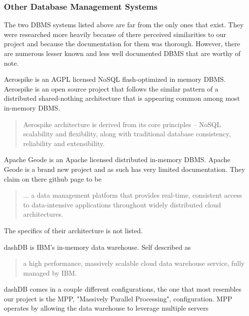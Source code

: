\documentclass[letterpaper]{article}
\begin{document}
	\subsubsection{Other Database Management Systems}
	The two DBMS systems listed above are far from the only ones that exist. They were
	researched more heavily because of there perceived similarities to our project and
	because the documentation for them was thorough. However, there are numerous lesser
	known and less well documented DBMS that are worthy of note.
	\par\vspace{\baselineskip}
	Aerospike is an AGPL licensed NoSQL flash-optimized in memory 
	DBMS. Aerospike is an open source project that follows the similar pattern of 
	a distributed shared-nothing architecture that is appearing common among most
	in-memory DBMS. 
	\begin{quote}
	Aerospike architecture is derived from its core principles – NoSQL scalability and
	flexibility, along with traditional database consistency, reliability and extensibility.
	\cite{aerospike}
	\end{quote}
	\par\vspace{\baselineskip}
	\cite{aerospike}
	\par\vspace{\baselineskip}	
	Apache Geode is an Apache licensed distributed in-memory DBMS. Apache Geode is a brand
	new project and as such has very limited documentation. They claim on there github page
	to be 
	\begin{quote}
	... a data management platform that provides real-time, consistent access to 
	data-intensive applications throughout widely distributed cloud architectures.
	\end{quote}
	The specifics of their architecture is not listed. 
	\par\vspace{\baselineskip}
	dashDB is IBM's in-memory data warehouse. Self described as 
	\begin{quote}
	a high performance, massively scalable cloud data warehouse service, 
	fully managed by IBM. \cite{dashDB}
	\end{quote}
	dashDB comes in a couple different configurations, the one that most resembles 
	our project is the MPP, "Massively Parallel Processing", configuration. 
	MPP operates by allowing the data warehouse to leverage multiple servers 
\end{document}
